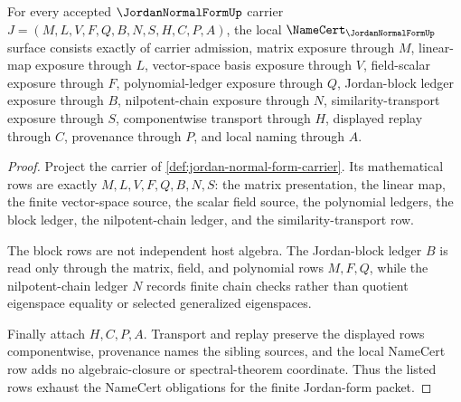 \begin{theorem}
\label{thm:jordan-normal-form-namecert-obligations}
For every accepted $\JordanNormalFormUp$ carrier $J=(M,L,V,F,Q,B,N,S,H,C,P,A)$, the local $\NameCert_{\JordanNormalFormUp}$ surface consists exactly of carrier admission, matrix exposure through $M$, linear-map exposure through $L$, vector-space basis exposure through $V$, field-scalar exposure through $F$, polynomial-ledger exposure through $Q$, Jordan-block ledger exposure through $B$, nilpotent-chain exposure through $N$, similarity-transport exposure through $S$, componentwise transport through $H$, displayed replay through $C$, provenance through $P$, and local naming through $A$.
\end{theorem}
\begin{proof}
Project the carrier of \autoref{def:jordan-normal-form-carrier}. Its mathematical rows are exactly $M,L,V,F,Q,B,N,S$: the matrix presentation, the linear map, the finite vector-space source, the scalar field source, the polynomial ledgers, the block ledger, the nilpotent-chain ledger, and the similarity-transport row.

The block rows are not independent host algebra. The Jordan-block ledger $B$ is read only through the matrix, field, and polynomial rows $M,F,Q$, while the nilpotent-chain ledger $N$ records finite chain checks rather than quotient eigenspace equality or selected generalized eigenspaces.

Finally attach $H,C,P,A$. Transport and replay preserve the displayed rows componentwise, provenance names the sibling sources, and the local NameCert row adds no algebraic-closure or spectral-theorem coordinate. Thus the listed rows exhaust the NameCert obligations for the finite Jordan-form packet.
\end{proof}

